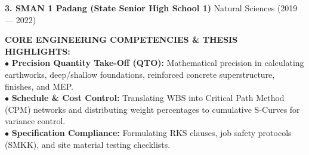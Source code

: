 \documentclass[10pt,a4paper,landscape]{article}
\begin{document}
\begin{minipage}[t]{0.58\linewidth}
\begin{tcolorbox}[sharp corners, boxrule=0.8pt, colframe=pborder, colback=white, left=3.5mm, right=3.5mm, top=2.5mm, bottom=2.5mm, height=100mm]
    {\fontsize{7.8pt}{9.2pt}\selectfont\bfseries\color{pnavy}3. SMAN 1 Padang (State Senior High School 1)} \hfill {\fontsize{6.8pt}{8pt}\selectfont\color{pmuted}Natural Sciences (2019 --- 2022)}
  \end{tcolorbox}
  \vspace{2mm}

  \begin{tcolorbox}[sharp corners, boxrule=0.6pt, colframe=pnavy, colback=pbglight, left=3.5mm, right=3.5mm, top=2.5mm, bottom=2.5mm, height=52mm]
    {\fontsize{7.2pt}{8.5pt}\selectfont\bfseries\color{pnavy}CORE ENGINEERING COMPETENCIES \& THESIS HIGHLIGHTS:}\\[1.5mm]
    {\fontsize{6.8pt}{8.8pt}\selectfont\color{psteel}
    $\bullet$ \textbf{Precision Quantity Take-Off (QTO):} Mathematical precision in calculating earthworks, deep/shallow foundations, reinforced concrete superstructure, finishes, and MEP.\\
    $\bullet$ \textbf{Schedule \& Cost Control:} Translating WBS into Critical Path Method (CPM) networks and distributing weight percentages to cumulative S-Curves for variance control.\\
    $\bullet$ \textbf{Specification Compliance:} Formulating RKS clauses, job safety protocols (SMKK), and site material testing checklists.
    }
  \end{tcolorbox}
\end{minipage}%
\hfill
\end{document}
